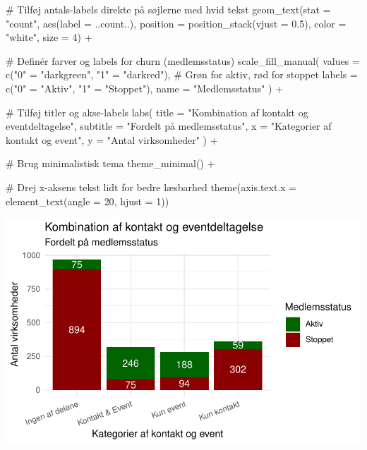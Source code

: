 \documentclass[
  11pt,
  letterpaper,
  DIV=11,
  numbers=noendperiod]{scrartcl}
\newenvironment{Shaded}{\begin{snugshade}}{\end{snugshade}}
\newcommand{\AttributeTok}[1]{\textcolor[rgb]{0.40,0.45,0.13}{#1}}
\newcommand{\CommentTok}[1]{\textcolor[rgb]{0.37,0.37,0.37}{#1}}
\newcommand{\DecValTok}[1]{\textcolor[rgb]{0.68,0.00,0.00}{#1}}
\newcommand{\FloatTok}[1]{\textcolor[rgb]{0.68,0.00,0.00}{#1}}
\newcommand{\FunctionTok}[1]{\textcolor[rgb]{0.28,0.35,0.67}{#1}}
\newcommand{\NormalTok}[1]{\textcolor[rgb]{0.00,0.23,0.31}{#1}}
\newcommand{\OtherTok}[1]{\textcolor[rgb]{0.00,0.23,0.31}{#1}}
\newcommand{\SpecialCharTok}[1]{\textcolor[rgb]{0.37,0.37,0.37}{#1}}
\newcommand{\StringTok}[1]{\textcolor[rgb]{0.13,0.47,0.30}{#1}}
\begin{document}
\begin{Shaded}
\begin{Highlighting}[]
  \CommentTok{\# Tilføj antals{-}labels direkte på søjlerne med hvid tekst}
  \FunctionTok{geom\_text}\NormalTok{(}\AttributeTok{stat =} \StringTok{"count"}\NormalTok{, }\FunctionTok{aes}\NormalTok{(}\AttributeTok{label =}\NormalTok{ ..count..),}
            \AttributeTok{position =} \FunctionTok{position\_stack}\NormalTok{(}\AttributeTok{vjust =} \FloatTok{0.5}\NormalTok{), }\AttributeTok{color =} \StringTok{"white"}\NormalTok{, }\AttributeTok{size =} \DecValTok{4}\NormalTok{) }\SpecialCharTok{+}
  
  \CommentTok{\# Definér farver og labels for churn (medlemsstatus)}
  \FunctionTok{scale\_fill\_manual}\NormalTok{(}
    \AttributeTok{values =} \FunctionTok{c}\NormalTok{(}\StringTok{"0"} \OtherTok{=} \StringTok{"darkgreen"}\NormalTok{, }\StringTok{"1"} \OtherTok{=} \StringTok{"darkred"}\NormalTok{),  }\CommentTok{\# Grøn for aktiv, rød for stoppet}
    \AttributeTok{labels =} \FunctionTok{c}\NormalTok{(}\StringTok{"0"} \OtherTok{=} \StringTok{"Aktiv"}\NormalTok{, }\StringTok{"1"} \OtherTok{=} \StringTok{"Stoppet"}\NormalTok{),}
    \AttributeTok{name =} \StringTok{"Medlemsstatus"}
\NormalTok{  ) }\SpecialCharTok{+}
  
  \CommentTok{\# Tilføj titler og akse{-}labels}
  \FunctionTok{labs}\NormalTok{(}
    \AttributeTok{title =} \StringTok{"Kombination af kontakt og eventdeltagelse"}\NormalTok{,}
    \AttributeTok{subtitle =} \StringTok{"Fordelt på medlemsstatus"}\NormalTok{,}
    \AttributeTok{x =} \StringTok{"Kategorier af kontakt og event"}\NormalTok{,}
    \AttributeTok{y =} \StringTok{"Antal virksomheder"}
\NormalTok{  ) }\SpecialCharTok{+}
  
  \CommentTok{\# Brug minimalistisk tema}
  \FunctionTok{theme\_minimal}\NormalTok{() }\SpecialCharTok{+}
  
  \CommentTok{\# Drej x{-}aksens tekst lidt for bedre læsbarhed}
  \FunctionTok{theme}\NormalTok{(}\AttributeTok{axis.text.x =} \FunctionTok{element\_text}\NormalTok{(}\AttributeTok{angle =} \DecValTok{20}\NormalTok{, }\AttributeTok{hjust =} \DecValTok{1}\NormalTok{))}
\end{Highlighting}
\end{Shaded}

\includegraphics{Quarto_files/figure-pdf/unnamed-chunk-6-3.pdf}
\end{document}
